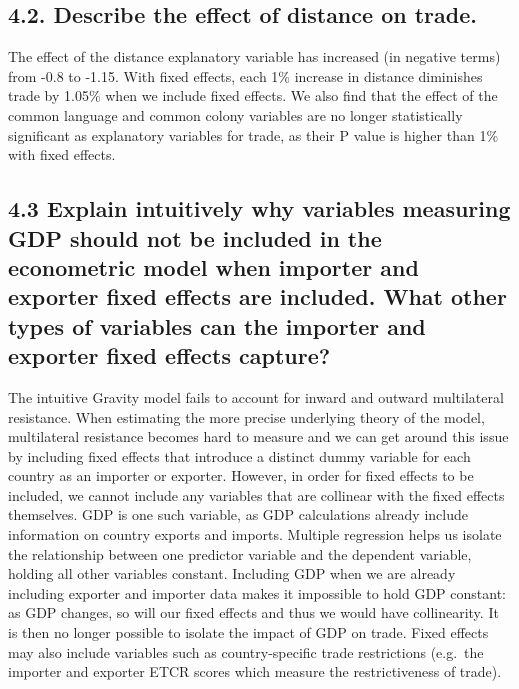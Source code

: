 \documentclass[
]{article}
\begin{document}
\hypertarget{describe-the-effect-of-distance-on-trade.-1}{%
\subsection{4.2. Describe the effect of distance on
trade.}\label{describe-the-effect-of-distance-on-trade.-1}}

The effect of the distance explanatory variable has increased (in
negative terms) from -0.8 to -1.15. With fixed effects, each 1\%
increase in distance diminishes trade by 1.05\% when we include fixed
effects. We also find that the effect of the common language and common
colony variables are no longer statistically significant as explanatory
variables for trade, as their P value is higher than 1\% with fixed
effects.

\hypertarget{explain-intuitively-why-variables-measuring-gdp-should-not-be-included-in-the-econometric-model-when-importer-and-exporter-fixed-effects-are-included.-what-other-types-of-variables-can-the-importer-and-exporter-fixed-effects-capture}{%
\subsection{4.3 Explain intuitively why variables measuring GDP should
not be included in the econometric model when importer and exporter
fixed effects are included. What other types of variables can the
importer and exporter fixed effects
capture?}\label{explain-intuitively-why-variables-measuring-gdp-should-not-be-included-in-the-econometric-model-when-importer-and-exporter-fixed-effects-are-included.-what-other-types-of-variables-can-the-importer-and-exporter-fixed-effects-capture}}

The intuitive Gravity model fails to account for inward and outward
multilateral resistance. When estimating the more precise underlying
theory of the model, multilateral resistance becomes hard to measure and
we can get around this issue by including fixed effects that introduce a
distinct dummy variable for each country as an importer or exporter.
However, in order for fixed effects to be included, we cannot include
any variables that are collinear with the fixed effects themselves. GDP
is one such variable, as GDP calculations already include information on
country exports and imports. Multiple regression helps us isolate the
relationship between one predictor variable and the dependent variable,
holding all other variables constant. Including GDP when we are already
including exporter and importer data makes it impossible to hold GDP
constant: as GDP changes, so will our fixed effects and thus we would
have collinearity. It is then no longer possible to isolate the impact
of GDP on trade. Fixed effects may also include variables such as
country-specific trade restrictions (e.g.~the importer and exporter ETCR
scores which measure the restrictiveness of trade).
\end{document}
